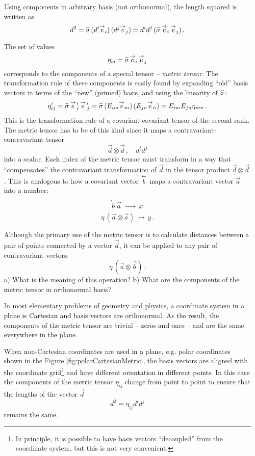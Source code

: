 Using components in arbitrary basis (not orthonormal), the length squared is written as
\[
d^2 = \widehat{\sigma}\, (d^i\overset{\rightarrow}{e}_i)\,(d^j\overset{\rightarrow}{e}_j) = d^id^j\,(\widehat{\sigma}\,\overset{\rightarrow}{e}_i\,\overset{\rightarrow}{e}_j)\,.
\]

The set of values
\[
\eta_{ij} = \widehat{\sigma}\,\overset{\rightarrow}{e}_i\,\overset{\rightarrow}{e}_j
\]
corresponds to the components of a special tensor -- \emph{metric
tensor}. The transformation rule of these components is easily found
by expanding ``old'' basis vectors in terms of the ``new'' (primed)
basis, and using the linearity of $\widehat{\sigma}$:
\[
\eta'_{ij} = \widehat{\sigma}\,\overset{\rightarrow}{e}\,'_i\,\overset{\rightarrow}{e}\,'_j =
\widehat{\sigma}\,(E_{im}\overset{\rightarrow}{e}_m)\,(E_{jn}\overset{\rightarrow}{e}_n) = E_{im}E_{jn}\eta_{mn}\,.
\]
This is the transformation rule of a covariant-covariant tensor of the
second rank. The metric tensor has to be of this kind since it maps a
contravariant-contravariant tensor
\[
\vec{d}\otimes\vec{d}\,,\quad d^id^j
\]
into a scalar. Each index of the metric tensor must transform in a way
that ``compensates'' the contravariant transformation of $\vec{d}$ in the
tensor product $\vec{d}\otimes\vec{d}$. This is analogous to how a
covariant vector $\overset{\leftarrow}{b}$ maps a contravariant vector $\vec{a}$ into
a number:
\[
\overset{\leftarrow}{b}\overset{\rightarrow}{a}\,\longrightarrow\, x\,
\]
\[
\eta\,(\vec{a}\otimes\vec{a})\,\longrightarrow\, y\,.
\]
\begin{exercise}\label{exe:metricTensorScalarProduct}
Although the primary use of the metric tensor is to calculate
distances between a pair of points connected by a vector $\vec{d}$,
it can be applied to any pair of contravariant vectors:
\[
\eta\,(\vec{a}\otimes\vec{b})\,.
\]
a) What is the meaning of this operation? b) What are the components of the
metric tensor in orthonormal basis?
\end{exercise}

In most elementary problems of geometry and physics, a coordinate
system in a plane is Cartesian and basis vectors are
orthonormal. As
the result, the components of the metric tensor are trivial -- zeros
and ones -- and are the same everywhere in the plane.

When non-Cartesian coordinates are used in a plane, e.g. polar
coordinates shown in the Figure
\ref{fig:polarCartesianMetric}, the
basis vectors are aligned with
the coordinate grid\footnote{In principle, it is possible to have
basis vectors ``decoupled'' from the coordinate system, but this is
not very convenient.} and have different orientation in different
points. In this case the components of the metric tensor $\eta_{ij}$
 change from point to point to ensure that the lengths of the vector
 $\vec{d}$
 \[
 d^2 = \eta_{ij}d^id^j
 \]
 remains the same.

